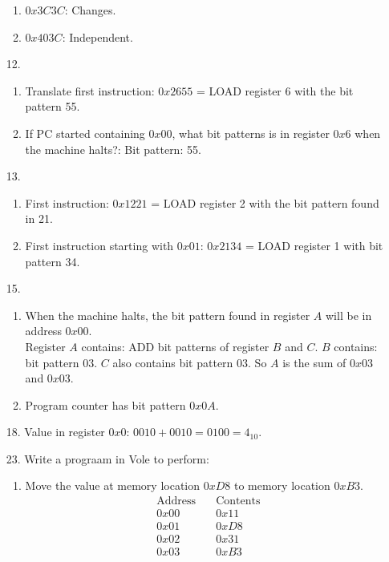 \documentclass[hidelinks,12pt]{article}
\begin{document}
\begin{enumerate}
\begin{enumerate}
            \item $0x3C3C$: Changes.
            \item $0x403C$: Independent.
        \end{enumerate}
    \item[12.]
        \begin{enumerate}
            \item Translate first instruction: $0x2655$ = LOAD register 6 with the bit pattern 55.
            \item If PC started containing $0x00$, what bit patterns is in register $0x6$ when the machine halts?: Bit pattern: 55.
        \end{enumerate}
    \item[13.]\begin{enumerate}
        \item First instruction: $0x1221$ = LOAD register 2 with the bit pattern found in 21.
        \item First instruction starting with $0x01$: $0x2134$ = LOAD register 1 with bit pattern 34.
    \end{enumerate}
    \item[15.]
        \begin{enumerate}
            \item When the machine halts, the bit pattern found in register $A$ will be in address $0x00$.\\ Register $A$ contains: ADD bit patterns of register $B$ and $C$. $B$ contains: bit pattern $03$. $C$ also contains bit pattern $03$. So $A$ is the sum of $0x03$ and $0x03$.
            \item Program counter has bit pattern $0x0A$.
        \end{enumerate}
    \item[18.]Value in register $0x0$: $0010+0010=0100=4_{10}$.
    \item[23.]Write a prograam in Vole to perform:
        \begin{enumerate}
            \item Move the value at memory location $0xD8$ to memory location $0xB3$.\begin{align*}
                    \text{Address}&\quad\text{Contents}\\
                    0x00 &\quad 0x11\\
                    0x01 &\quad 0xD8\\
                    0x02 &\quad 0x31\\
                    0x03 &\quad 0xB3\\

\end{align*}
\end{enumerate}
\end{enumerate}
\end{document}
